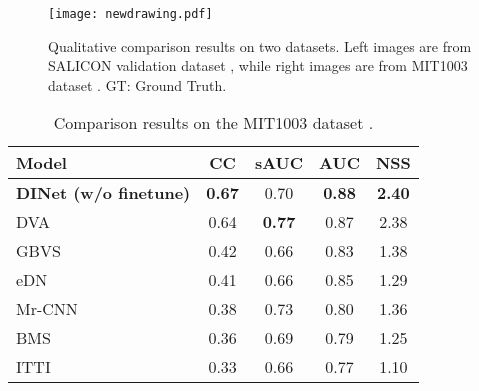 \begin{figure*}[h]


	\centering
\texttt{[image: newdrawing.pdf]}
	\caption{Qualitative comparison results on two datasets. Left images are from SALICON validation dataset \cite{jiang2015salicon}, while right images are from MIT1003 dataset \cite{judd2009learning}. GT: Ground Truth.}
	\label{fig:salicon}
\end{figure*} 

 








\begin{table}[]
\centering
	\caption{Comparison results on the MIT1003 dataset \cite{judd2009learning}.}
	\label{MIT1003}
	\begin{tabular}{|l|c c c c|}
		\hline
		Model                                     & CC   & sAUC & AUC  & NSS  \\ \hline
		\textbf{DINet (w/o finetune)}                      & \textbf{0.67} & 0.70  &\textbf{0.88} &\textbf{2.40}  \\ \hline
		DVA \cite{wang2017deep}                                      & 0.64 & \textbf{0.77} & 0.87 & 2.38  \\ \hline
		GBVS    \cite{harel2007graph}                                  & 0.42 & 0.66 & 0.83 & 1.38  \\ \hline
		eDN    \cite{vig2014large}                                   & 0.41 & 0.66 & 0.85 & 1.29   \\ \hline		
		Mr-CNN \cite{liu2016learning}                                   & 0.38 & 0.73 & 0.80  & 1.36  \\ \hline
		BMS    \cite{zhang2013saliency}                                    & 0.36 & 0.69 & 0.79 & 1.25  \\ \hline
		ITTI   \cite{itti1998model}                                    & 0.33 & 0.66 & 0.77 & 1.10  \\ \hline
	\end{tabular}
	\vspace{-4mm}
\end{table}


